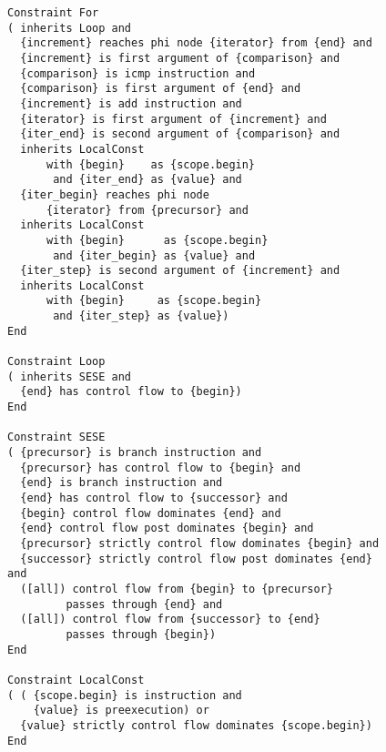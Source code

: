 \begin{figure}[p]
\begin{lstlisting}[language=IDL, firstnumber=140]
Constraint For
( inherits Loop and
  {increment} reaches phi node {iterator} from {end} and
  {increment} is first argument of {comparison} and
  {comparison} is icmp instruction and
  {comparison} is first argument of {end} and
  {increment} is add instruction and
  {iterator} is first argument of {increment} and
  {iter_end} is second argument of {comparison} and
  inherits LocalConst
      with {begin}    as {scope.begin}
       and {iter_end} as {value} and
  {iter_begin} reaches phi node
      {iterator} from {precursor} and
  inherits LocalConst
      with {begin}      as {scope.begin}
       and {iter_begin} as {value} and
  {iter_step} is second argument of {increment} and
  inherits LocalConst
      with {begin}     as {scope.begin}
       and {iter_step} as {value})
End

Constraint Loop
( inherits SESE and
  {end} has control flow to {begin})
End

Constraint SESE
( {precursor} is branch instruction and
  {precursor} has control flow to {begin} and
  {end} is branch instruction and
  {end} has control flow to {successor} and
  {begin} control flow dominates {end} and
  {end} control flow post dominates {begin} and
  {precursor} strictly control flow dominates {begin} and
  {successor} strictly control flow post dominates {end} and
  ([all]) control flow from {begin} to {precursor}
         passes through {end} and
  ([all]) control flow from {successor} to {end}
         passes through {begin})
End

Constraint LocalConst
( ( {scope.begin} is instruction and
    {value} is preexecution) or
  {value} strictly control flow dominates {scope.begin})
End
\end{lstlisting}
\end{figure}

